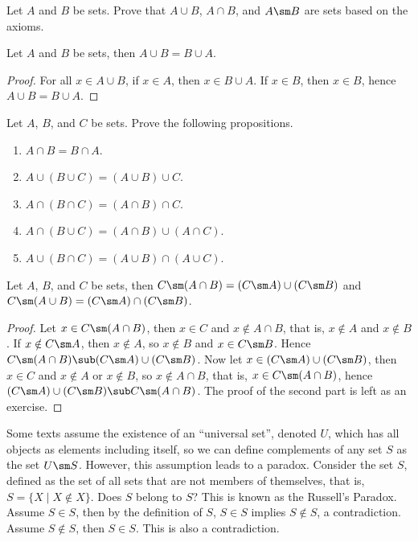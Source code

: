 \documentclass[10pt]{article}
\begin{document}
\begin{problem}
    Let $A$ and $B$ be sets. Prove that $A\cup B$, $A\cap B$, and $A\sm B$ are sets based on the axioms.
\end{problem}
\begin{proposition}
    Let $A$ and $B$ be sets, then $A\cup B=B\cup A$.
\end{proposition}
\begin{proof}
    For all $x\in A\cup B$, if $x\in A$, then $x\in B\cup A$. If $x\in B$, then $x\in B$, hence $A\cup B=B\cup A$.
\end{proof}
\begin{problem}
    Let $A$, $B$, and $C$ be sets. Prove the following propositions.
    \begin{enumerate}
        \item $A\cap B=B\cap A$.
        \item $A\cup(B\cup C)=(A\cup B)\cup C$.
        \item $A\cap(B\cap C)=(A\cap B)\cap C$.
        \item $A\cap(B\cup C)=(A\cap B)\cup(A\cap C)$.
        \item $A\cup(B\cap C)=(A\cup B)\cap(A\cup C)$.
    \end{enumerate}
\end{problem}
\begin{theorem}
    Let $A$, $B$, and $C$ be sets, then $C\sm(A\cap B)=(C\sm A)\cup(C\sm B)$ and $C\sm(A\cup B)=(C\sm A)\cap(C\sm B)$.
\end{theorem}
\begin{proof}
    Let $x\in C\sm(A\cap B)$, then $x\in C$ and $x\notin A\cap B$, that is, $x\notin A$ and $x\notin B$. If $x\notin C\sm A$, then $x\notin A$, so $x\notin B$ and $x\in C\sm B$. Hence $C\sm(A\cap B)\sub(C\sm A)\cup(C\sm B)$. Now let $x\in(C\sm A)\cup(C\sm B)$, then $x\in C$ and $x\notin A$ or $x\notin B$, so $x\notin A\cap B$, that is, $x\in C\sm(A\cap B)$, hence $(C\sm A)\cup(C\sm B)\sub C\sm(A\cap B)$. The proof of the second part is left as an exercise.
\end{proof}
\par
Some texts assume the existence of an ``universal set'', denoted $U$, which has all objects as elements including itself, so we can define complements of any set $S$ as the set $U\sm S$. However, this assumption leads to a paradox. Consider the set $S$, defined as the set of all sets that are not members of themselves, that is, $S=\{X\mid X\notin X\}$. Does $S$ belong to $S$? This is known as the Russell's Paradox. Assume $S\in S$, then by the definition of $S$, $S\in S$ implies $S\notin S$, a contradiction. Assume $S\notin S$, then $S\in S$. This is also a contradiction.
\end{document}
